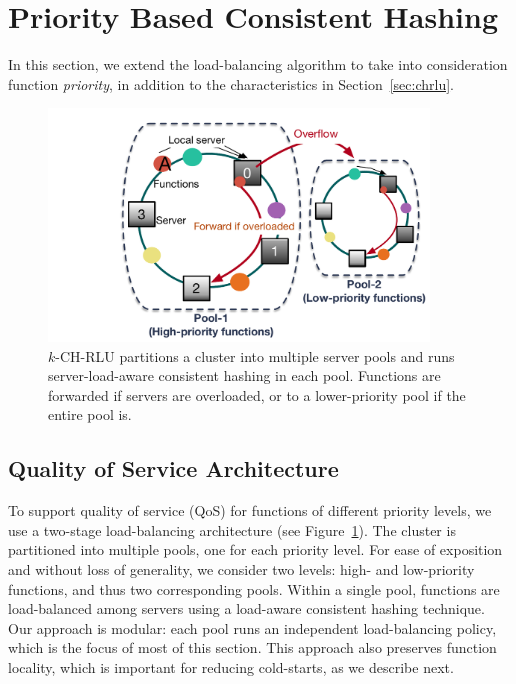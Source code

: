 \section{Priority Based Consistent Hashing} %
\label{sec:qos-chrlu}

In this section, we extend the load-balancing algorithm to take into consideration function \emph{priority}, in addition to the characteristics in Section~\ref{sec:chrlu}. 

\begin{figure}
\centering
\hspace{-2cm}\includegraphics[width=0.9\textwidth]{chrlu/qos/figs/k-rlu2.pdf}
\caption{$k$-CH-RLU partitions a cluster into multiple server pools and runs server-load-aware consistent hashing in each pool. Functions are forwarded if servers are overloaded, or to a lower-priority pool if the entire pool is.}
\label{fig:2-pool-arch}
\end{figure}

\subsection{Quality of Service Architecture}

To support quality of service (QoS) for functions of different priority levels, we use a two-stage load-balancing architecture (see Figure~\ref{fig:2-pool-arch}). 
The cluster is partitioned into multiple pools, one for each priority level.
For ease of exposition and without loss of generality, we consider two levels: high- and low-priority functions, and thus two corresponding pools. 
Within a single pool, functions are load-balanced among servers using a load-aware consistent hashing technique. 
Our approach is modular: each pool runs an independent load-balancing policy, which is the focus of most of this section. 
This approach also preserves function locality, which is important for reducing cold-starts, as we describe next.  


